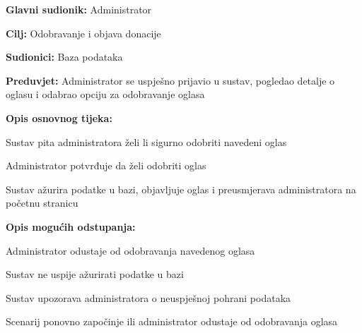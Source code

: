 					\noindent {}
					\begin{packed_item}
	
						\item \textbf{Glavni sudionik: }Administrator
						\item  \textbf{Cilj:} Odobravanje i objava donacije
						\item  \textbf{Sudionici:} Baza podataka
						\item  \textbf{Preduvjet:} Administrator se uspješno prijavio u sustav, pogledao detalje o oglasu i odabrao opciju za odobravanje oglasa
						\item  \textbf{Opis osnovnog tijeka:}
						
						\item[] \begin{packed_enum}
							\item Sustav pita administratora želi li sigurno odobriti navedeni oglas
							\item Administrator potvrđuje da želi odobriti oglas
							\item Sustav ažurira podatke u bazi, objavljuje oglas i preusmjerava administratora na početnu stranicu
						\end{packed_enum}

						\item  \textbf{Opis mogućih odstupanja:}

						\item[] \begin{packed_item}
							\item[2.a] Administrator odustaje od odobravanja navedenog oglasa
							\item[3.a] Sustav ne uspije ažurirati podatke u bazi
							\item[] \begin{packed_enum}
								\item Sustav upozorava administratora o neuspješnoj pohrani podataka
								\item Scenarij ponovno započinje ili administrator odustaje od odobravanja oglasa
							\end{packed_enum}					
						\end{packed_item}
					\end{packed_item}

